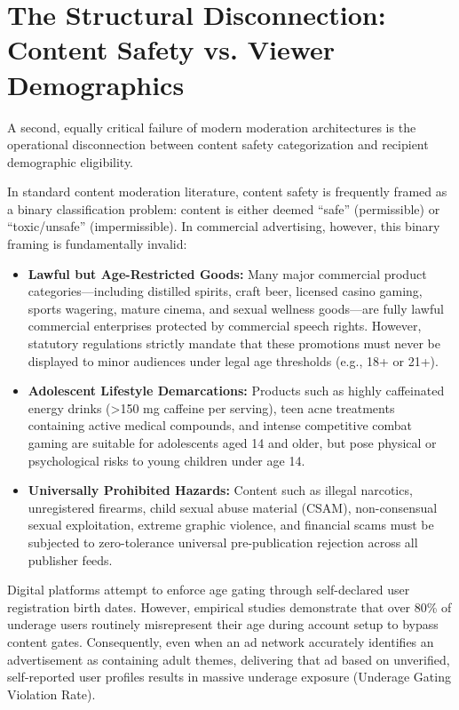 \documentclass[12pt,a4paper]{report}
\begin{document}
\section{The Structural Disconnection: Content Safety vs. Viewer Demographics}

A second, equally critical failure of modern moderation architectures is the operational disconnection between content safety categorization and recipient demographic eligibility.

In standard content moderation literature, content safety is frequently framed as a binary classification problem: content is either deemed ``safe'' (permissible) or ``toxic/unsafe'' (impermissible). In commercial advertising, however, this binary framing is fundamentally invalid:
\begin{itemize}
    \item \textbf{Lawful but Age-Restricted Goods:} Many major commercial product categories---including distilled spirits, craft beer, licensed casino gaming, sports wagering, mature cinema, and sexual wellness goods---are fully lawful commercial enterprises protected by commercial speech rights. However, statutory regulations strictly mandate that these promotions must never be displayed to minor audiences under legal age thresholds (e.g., 18+ or 21+).
    \item \textbf{Adolescent Lifestyle Demarcations:} Products such as highly caffeinated energy drinks (>150 mg caffeine per serving), teen acne treatments containing active medical compounds, and intense competitive combat gaming are suitable for adolescents aged 14 and older, but pose physical or psychological risks to young children under age 14.
    \item \textbf{Universally Prohibited Hazards:} Content such as illegal narcotics, unregistered firearms, child sexual abuse material (CSAM), non-consensual sexual exploitation, extreme graphic violence, and financial scams must be subjected to zero-tolerance universal pre-publication rejection across all publisher feeds.
\end{itemize}

Digital platforms attempt to enforce age gating through self-declared user registration birth dates. However, empirical studies demonstrate that over 80\% of underage users routinely misrepresent their age during account setup to bypass content gates. Consequently, even when an ad network accurately identifies an advertisement as containing adult themes, delivering that ad based on unverified, self-reported user profiles results in massive underage exposure (Underage Gating Violation Rate).
\end{document}
